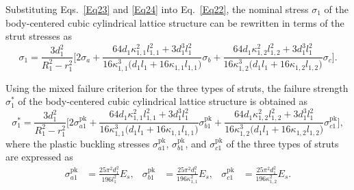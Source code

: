 \documentclass[12pt,a4paper]{article}
\begin{document}
	Substituting Eqs.~\eqref{Eq23} and \eqref{Eq24} into Eq.~\eqref{Eq22}, the nominal stress $\sigma_1$ of the body-centered cubic cylindrical lattice structure can be rewritten in terms of the strut stresses as
	\begin{equation}
				\sigma_1
			=
			\frac{3d_1^2}{R_1^2-r_1^2}
			\Bigg[
			2\sigma_a
			+
			\frac{
				64d_1\kappa_{1,1}^2l_{1,1}^2
				+3d_1^3l_1^2
			}{
				16\kappa_{1,1}^3
				\bigl(d_1l_1+16\kappa_{1,1}l_{1,1}\bigr)
			}
			\sigma_b 
		+
			\frac{
				64d_1\kappa_{1,2}^2l_{1,2}^2
				+3d_1^3l_1^2
			}{
				16\kappa_{1,2}^3
				\bigl(d_1l_1+16\kappa_{1,2}l_{1,2}\bigr)
			}
			\sigma_c
			\Bigg].
		\label{Eq25}
	\end{equation}
	
	Using the mixed failure criterion for the three types of struts, the failure strength $\sigma_1^*$ of the body-centered cubic cylindrical lattice structure is obtained as
	\begin{equation}
			\sigma_1^*
			=
			\frac{3d_1^2}{R_1^2-r_1^2}
			\Bigg[
			2\sigma_{a1}^{\mathrm{pk}}
			+
			\frac{
				64d_1\kappa_{1,1}^2l_{1,1}^2
				+3d_1^3l_1^2
			}{
				16\kappa_{1,1}^3
				\bigl(d_1l_1+16\kappa_{1,1}l_{1,1}\bigr)
			}
			\sigma_{b1}^{\mathrm{pk}} 
			+
			\frac{
				64d_1\kappa_{1,2}^2l_{1,2}^2
				+3d_1^3l_1^2
			}{
				16\kappa_{1,2}^3
				\bigl(d_1l_1+16\kappa_{1,2}l_{1,2}\bigr)
			}
			\sigma_{c1}^{\mathrm{pk}}
			\Bigg],
		\label{Eq26}
	\end{equation}
	where the plastic buckling stresses $\sigma_{a1}^{\mathrm{pk}}$, $\sigma_{b1}^{\mathrm{pk}}$, and $\sigma_{c1}^{\mathrm{pk}}$ of the three types of struts are expressed as
	\[
	\begin{aligned}
		\sigma_{a1}^{\mathrm{pk}}
		&=
		\frac{25\pi^2d_1^2}{196l_1^2}E_s, &
		\sigma_{b1}^{\mathrm{pk}}
		&=
		\frac{25\pi^2d_1^2}{196\kappa_{1,1}^2}E_s, &
		\sigma_{c1}^{\mathrm{pk}}
		&=
		\frac{25\pi^2d_1^2}{196\kappa_{1,2}^2}E_s .
	\end{aligned}
	\]
	
\end{document}
